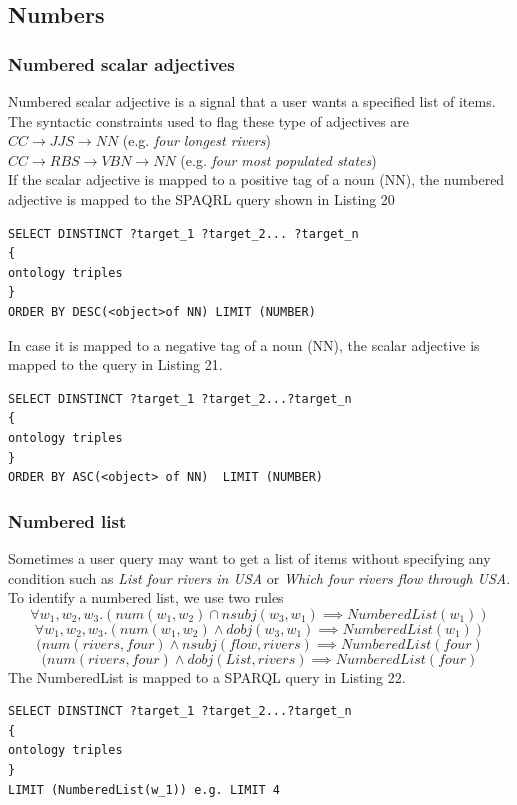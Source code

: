 \documentclass[review]{elsarticle}
\begin{document}
\subsection{Numbers}
\subsubsection{Numbered scalar adjectives}
Numbered scalar adjective is a signal that a user wants a specified list of items. The syntactic constraints used to flag these type of adjectives are \\
$CC\rightarrow JJS\rightarrow NN$ (e.g. \textit{four longest rivers})\\
$CC\rightarrow RBS\rightarrow VBN\rightarrow NN $ (e.g. \textit{four most populated states})\\
If the scalar adjective  is mapped to a positive tag of a noun (NN), the numbered adjective is mapped to the SPAQRL query shown in Listing 20
\begin{lstlisting}[caption=positive numbered adjective template]
SELECT DINSTINCT ?target_1 ?target_2... ?target_n
{
ontology triples
}
ORDER BY DESC(<object>of NN) LIMIT (NUMBER)
\end{lstlisting}
In case it is mapped to a negative tag of a noun (NN), the scalar adjective is mapped to the query in Listing 21.
\begin{lstlisting}[caption=negative numbered adjective template]
SELECT DINSTINCT ?target_1 ?target_2...?target_n
{
ontology triples
}
ORDER BY ASC(<object> of NN)  LIMIT (NUMBER)
\end{lstlisting}
\subsubsection{Numbered list}
Sometimes a user query may want to get a list of items without specifying any condition such as \textit{List four rivers in USA} or  \textit{Which four rivers flow through USA}. To identify a  numbered list, we use two rules
\begin{equation}
\forall  w_1,w_2,w_3.(num(w_1,w_2)\cap nsubj(w_3,w_1)\implies NumberedList(w_1))
\end{equation}
\begin{equation}
\forall  w_1,w_2,w_3.(num(w_1,w_2)\land dobj(w_3,w_1)\implies NumberedList(w_1))
\end{equation}
\begin{equation}
 (num(rivers, four)\land nsubj(flow,rivers)\implies NumberedList(four)
 \end{equation}
 \begin{equation}
 (num(rivers, four)\land dobj(List,rivers)\implies NumberedList(four)
 \end{equation}
 The NumberedList is mapped to a SPARQL query in Listing 22.
\begin{lstlisting}[caption= numbered list template]
SELECT DINSTINCT ?target_1 ?target_2...?target_n
{
ontology triples
}
LIMIT (NumberedList(w_1)) e.g. LIMIT 4
\end{lstlisting}
\end{document}
